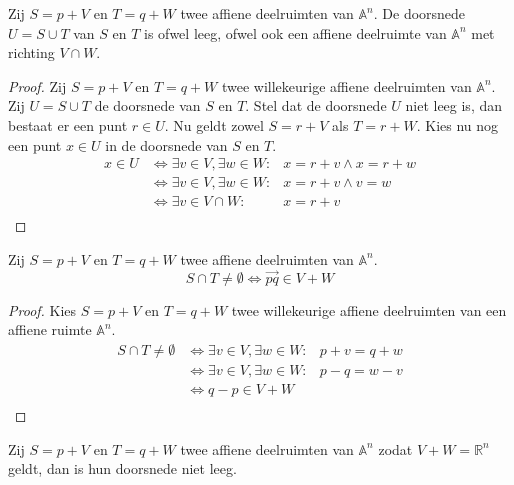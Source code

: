 \documentclass[main.tex]{subfiles}
\begin{document}
\begin{st}
\label{st:affiene-doorsnede-ruimte}
  Zij $S = p + V$ en $T = q + W$ twee affiene deelruimten van $\mathbb{A}^{n}$.
  De doorsnede $U = S \cup T$ van $S$ en $T$ is ofwel leeg, ofwel ook een affiene deelruimte van $\mathbb{A}^{n}$ met richting $V \cap W$.

  \begin{proof}
    Zij $S = p + V$ en $T = q + W$ twee willekeurige affiene deelruimten van $\mathbb{A}^{n}$.
    Zij $U = S \cup T$ de doorsnede van $S$ en $T$.
    Stel dat de doorsnede $U$ niet leeg is, dan bestaat er een punt $r \in U$. Nu geldt zowel $S = r + V$ als $T = r + W$. Kies nu nog een punt $x \in U$ in de doorsnede van $S$ en $T$.
    \[
    \begin{array}{cll}
      x \in U &\Leftrightarrow \exists v \in V, \exists w \in W:& x = r + v \wedge x = r + w\\
              &\Leftrightarrow \exists v \in V, \exists w \in W:& x = r + v \wedge v = w\\
              &\Leftrightarrow \exists v \in V \cap W:& x = r + v\\
    \end{array}
    \]
  \end{proof}
\end{st}


\begin{st}
  Zij $S = p + V$ en $T = q + W$ twee affiene deelruimten van $\mathbb{A}^{n}$.
  \[ S \cap T \neq \emptyset \Leftrightarrow \overrightarrow{pq} \in V + W \]

  \begin{proof}
    Kies $S = p + V$ en $T = q + W$ twee willekeurige affiene deelruimten van een affiene ruimte $\mathbb{A}^{n}$.
    \[
    \begin{array}{cll}
      S \cap T \neq \emptyset &\Leftrightarrow \exists v \in V, \exists w \in W:& p + v = q + w\\
                              &\Leftrightarrow \exists v \in V, \exists w \in W:& p - q = w - v\\
                              &\Leftrightarrow q - p \in V + W\\
    \end{array}
    \]
  \end{proof}
\end{st}

\begin{gev}
  \label{gev:deelruimten-niet-leeg-dimensie-n}
  Zij $S = p + V$ en $T = q + W$ twee affiene deelruimten van $\mathbb{A}^{n}$ zodat $V + W = \mathbb{R}^{n}$ geldt, dan is hun doorsnede niet leeg.
\end{gev}
\end{document}
